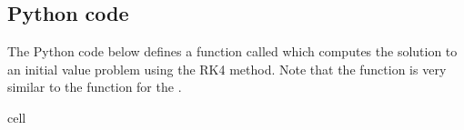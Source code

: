 \documentclass[letterpaper,10pt,english]{jupyterBook}
\begin{document}
\subsection{Python code}
\label{\detokenize{2_ERKs/2.3_Solving_IVPs_using_ERK_methods:python-code}}\label{\detokenize{2_ERKs/2.3_Solving_IVPs_using_ERK_methods:rk4-python-code}}
\sphinxAtStartPar
The Python code below defines a function called  which computes the solution to an initial value problem using the RK4 method. Note that the function is very similar to the function for the {\hyperref[\detokenize{1_IVPs/1.4_RK2:rk2-python-code}]{}}.

\begin{sphinxuseclass}{cell}\begin{sphinxVerbatimInput}


\end{sphinxVerbatimInput}
\end{sphinxuseclass}
\end{document}
